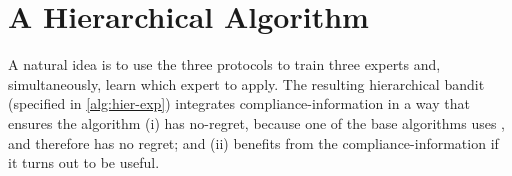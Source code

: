 



\section{A Hierarchical Algorithm}

A natural idea is to use the three protocols to train three experts and, simultaneously, learn which expert to apply. The resulting hierarchical bandit (specified in  \ref{alg:hier-exp}) integrates compliance-information in a way that ensures the algorithm (i) has no-regret, because one of the base algorithms uses \chosen, and therefore has no regret; and (ii) benefits from the compliance-information if it turns out to be useful.

